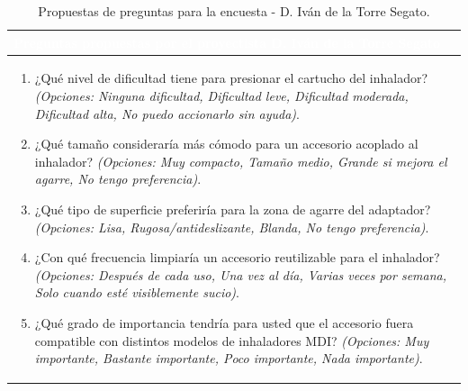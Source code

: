 \documentclass[11pt,a4paper]{article}
\begin{document}
\begin{table}[H]
    \centering
    \small
    \renewcommand{\arraystretch}{1.5}
    \begin{tabularx}{\linewidth}{|X|}
        \hline
        \rowcolor{ArthroNavy}
        \textcolor{white}{\textbf{Preguntas propuestas por el proyectista D. Iván de la Torre Segato}} \\ \hline
        \rowcolor{ArthroTeal!5}
        \vspace{0.1cm}
        \begin{enumerate}[leftmargin=0.8cm, itemsep=0.2cm]
            \item ¿Qué nivel de dificultad tiene para presionar el cartucho del inhalador? \textit{(Opciones: Ninguna dificultad, Dificultad leve, Dificultad moderada, Dificultad alta, No puedo accionarlo sin ayuda)}.
            \item ¿Qué tamaño consideraría más cómodo para un accesorio acoplado al inhalador? \textit{(Opciones: Muy compacto, Tamaño medio, Grande si mejora el agarre, No tengo preferencia)}.
            \item ¿Qué tipo de superficie preferiría para la zona de agarre del adaptador? \textit{(Opciones: Lisa, Rugosa/antideslizante, Blanda, No tengo preferencia)}.
            \item ¿Con qué frecuencia limpiaría un accesorio reutilizable para el inhalador? \textit{(Opciones: Después de cada uso, Una vez al día, Varias veces por semana, Solo cuando esté visiblemente sucio)}.
            \item ¿Qué grado de importancia tendría para usted que el accesorio fuera compatible con distintos modelos de inhaladores MDI? \textit{(Opciones: Muy importante, Bastante importante, Poco importante, Nada importante)}.
        \end{enumerate}
        \vspace{0.1cm} \\ \hline
    \end{tabularx}
    \caption{Propuestas de preguntas para la encuesta - D. Iván de la Torre Segato.}
    \label{tab:encuesta_ivan}
\end{table}

\vspace{0.4cm}
\end{document}

